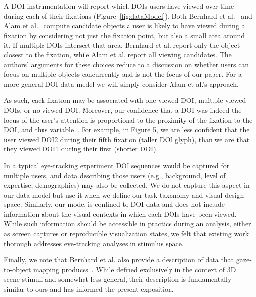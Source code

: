 A DOI instrumentation will report which DOIs users have viewed over time during each of their fixations (Figure~\ref{fig:dataModel}). Both Bernhard et al.~\cite{bernhard2014gaze} and Alam et al.~\cite{alam15analyzing} compute candidate objects a user is likely to have viewed during a fixation by considering not just the fixation point, but also a small area around it.  If multiple DOIs intersect that area, Bernhard et al. report only the object closest to the fixation, while Alam et al. report all viewing candidates.  The authors' arguments for these choices reduce to a discussion on whether users can focus on multiple objects concurrently and is not the focus of our paper. For a more general DOI data model we will simply consider Alam et al.'s approach. 

As such, each fixation may be associated with one viewed DOI, multiple viewed DOIs, or no viewed DOI. Moreover, our confidence that a DOI was indeed the locus of the user's attention is proportional to the proximity of the fixation to the DOI, and thus variable~\cite{alam15analyzing}. For example, in Figure 5, we are less confident that the user viewed DOI2 during their fifth fixation (taller DOI glyph), than we are that they viewed DOI1 during their first (shorter DOI). 

In a typical eye-tracking experiment DOI sequences would be captured for multiple users, and data describing those users (e.g., background, level of expertise, demographics) may also be collected. We do not capture this aspect in our data model but use it when we define our task taxonomy and visual design space. Similarly, our model is confined to DOI data and does not include information about the visual contexts in which each DOIs have been viewed.  While such information should be accessible in practice during an analysis, either as screen captures or reproducible visualization states, we felt that existing work thorough addresses eye-tracking analyses in stimulus space. 

Finally, we note that Bernhard et al. also provide a description of data that gaze-to-object mapping produces~\cite{bernhard2014gaze}. While defined exclusively in the context of 3D scene stimuli and somewhat less general, their description is fundamentally similar to ours and has informed the present exposition. 


